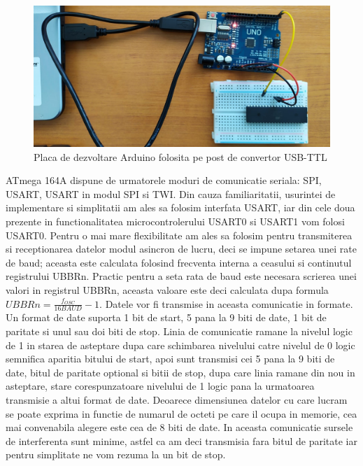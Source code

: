 \documentclass[12pt]{article}
\begin{document}
\begin{figure}[H]
\centering
\includegraphics[width=\textwidth]{Pictures/convertor.jpeg}
\caption{Placa de dezvoltare Arduino folosita pe post de convertor USB-TTL}
\end{figure}

\vspace{4 mm}

\hspace{8 mm} ATmega 164A dispune de urmatorele moduri de comunicatie seriala: SPI, USART, USART in modul SPI si TWI. Din cauza familiaritatii, usurintei de implementare si simplitatii am ales sa folosim interfata USART, iar din cele doua prezente in functionalitatea microcontrolerului USART0 si USART1 vom folosi USART0. Pentru o mai mare flexibilitate am ales sa folosim pentru transmiterea si receptionarea datelor modul asincron de lucru, deci se impune setarea unei rate de baud; aceasta este calculata folosind frecventa interna a ceasului si continutul registrului UBBRn. Practic pentru a seta rata de baud este necesara scrierea unei valori in registrul UBBRn, aceasta valoare este deci calculata dupa formula $UBBRn = \frac{f_{OSC}}{16BAUD}-1$. Datele vor fi transmise in aceasta comunicatie in formate. Un format de date suporta 1 bit de start, 5 pana la 9 biti de date, 1 bit de paritate si unul sau doi biti de stop. Linia de comunicatie ramane la nivelul logic de 1 in starea de asteptare dupa care schimbarea nivelului catre nivelul de 0 logic semnifica aparitia bitului de start, apoi sunt transmisi cei 5 pana la 9 biti de date, bitul de paritate optional si bitii de stop, dupa care linia ramane din nou in asteptare, stare corespunzatoare nivelului de 1 logic pana la urmatoarea transmisie a altui format de date. Deoarece dimensiunea datelor cu care lucram se poate exprima in functie de numarul de octeti pe care il ocupa in memorie, cea mai convenabila alegere este cea de 8 biti de date. In aceasta comunicatie sursele de interferenta sunt minime, astfel ca am deci transmisia fara bitul de paritate iar pentru simplitate ne vom rezuma la un bit de stop.
\end{document}
